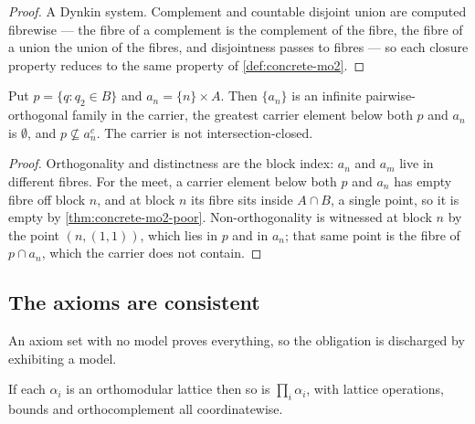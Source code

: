 \begin{proof}
  \leanok
  A Dynkin system. Complement and countable disjoint union are computed
  fibrewise --- the fibre of a complement is the complement of the fibre, the
  fibre of a union the union of the fibres, and disjointness passes to fibres
  --- so each closure property reduces to the same property of
  \ref{def:concrete-mo2}.
\end{proof}

\begin{theorem}
  \label{thm:concrete-descent}
  \leanok
  Put $p = \{q : q_2 \in B\}$ and $a_n = \{n\} \times A$. Then $\{a_n\}$ is an
  infinite pairwise-orthogonal family in the carrier, the greatest carrier
  element below both $p$ and $a_n$ is $\emptyset$, and $p \not\subseteq a_n^{c}$.
  The carrier is not intersection-closed.
\end{theorem}

\begin{proof}
  \leanok
  Orthogonality and distinctness are the block index: $a_n$ and $a_m$ live in
  different fibres. For the meet, a carrier element below both $p$ and $a_n$
  has empty fibre off block $n$, and at block $n$ its fibre sits inside
  $A \cap B$, a single point, so it is empty by \ref{thm:concrete-mo2-poor}.
  Non-orthogonality is witnessed at block $n$ by the point $(n, (1,1))$, which
  lies in $p$ and in $a_n$; that same point is the fibre of $p \cap a_n$, which
  the carrier does not contain.
\end{proof}

\subsection{The axioms are consistent}

An axiom set with no model proves everything, so the obligation is discharged by
exhibiting a model.

\begin{theorem}
  \label{thm:prod-oml}
  \leanok
  If each $\alpha_i$ is an orthomodular lattice then so is $\prod_i \alpha_i$,
  with lattice operations, bounds and orthocomplement all coordinatewise.
\end{theorem}

